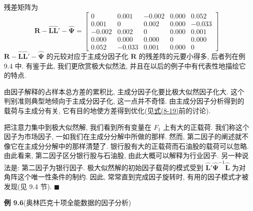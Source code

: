 
残差矩阵为
\[
\mathbf{R}-\hat{\mathbf{L}}\hat{\mathbf{L}}'-\hat{\boldsymbol{\Psi}}=\begin{bmatrix}
0&0.001&-0.002&0.000&0.052\\
0.001&0&0.002&0.000&-0.033\\
-0.002&0.002&0&0.000&0.001\\
0.000&0.000&0.000&0&0.000\\
0.052&-0.033&0.001&0.000&0
\end{bmatrix}
\]
$\mathbf{R}-\hat{\mathbf{L}}\hat{\mathbf{L}}'-\hat{\boldsymbol{\Psi}}$ 的元较对应于主成分因子化 $\mathbf{R}$ 的残差阵的元要小得多, 后者列在例 9.4 中. 有鉴于此, 我们更欣赏极大似然法, 并且在以后的例子中有代表性地描绘它的特点.

由因子解释的占样本总方差的累积比, 主成分因子化要比极大似然因子化大. 这个判别准则典型地倾向于主成分因子化, 这一点并不奇怪. 由主成分因子分析得到的载荷与主成分有关, 它有目的地使方差得到优化(见\hyperref[eq:8-19]{式(8-19)}前的讨论).

把注意力集中到极大似然解, 我们看到所有变量在 $F_1$ 上有大的正载荷. 我们称这个因子为市场因子, 一如我们在主成分分解中所做的那样. 然而, 第二因子的阐述就不像它在主成分分解中的那样清楚了. 银行股有大的正载荷而石油股的载荷可以忽略. 由此看来, 第二因子区分银行股与石油股, 由此大概可以解释为行业因子. 另一种说法是: 第二因子为银行因子. 极大似然解的初始因子载荷的模式受到 $\hat{\mathbf{L}}'\hat{\boldsymbol{\Psi}}^{-1}\hat{\mathbf{L}}$ 为对角阵这个唯一性条件的制约. 因此, 常常直到完成因子旋转时, 有用的因子模式才被发现(见 9.4 节). \hfill$\blacksquare$

\noindent\textbf{例 9.6}\quad (奥林匹克十项全能数据的因子分析)

